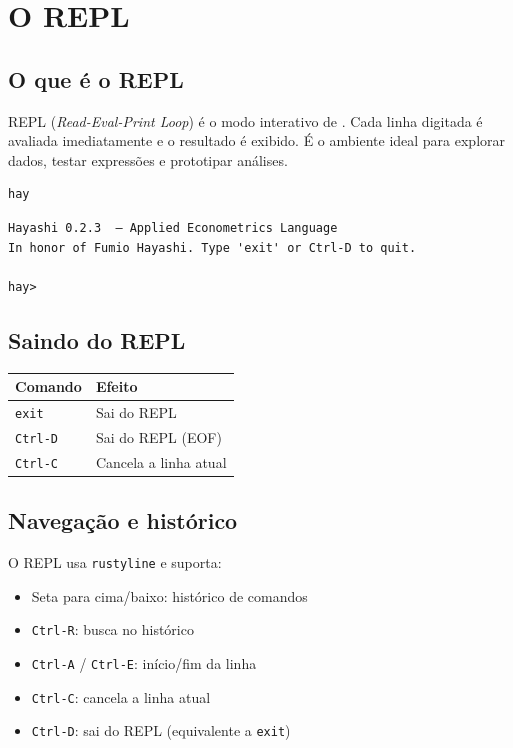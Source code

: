 \chapter{O REPL}

\section{O que é o REPL}

REPL (\textit{Read-Eval-Print Loop}) é o modo interativo de \hayashi{}. Cada linha
digitada é avaliada imediatamente e o resultado é exibido. É o ambiente ideal para
explorar dados, testar expressões e prototipar análises.

\begin{lstlisting}[style=inline, language=sh]
hay
\end{lstlisting}

\begin{lstlisting}[style=inline]
Hayashi 0.2.3  — Applied Econometrics Language
In honor of Fumio Hayashi. Type 'exit' or Ctrl-D to quit.

hay>
\end{lstlisting}

\section{Saindo do REPL}

\begin{center}
\begin{tabular}{ll}
\toprule
\textbf{Comando} & \textbf{Efeito} \\
\midrule
\texttt{exit}   & Sai do REPL \\
\texttt{Ctrl-D} & Sai do REPL (EOF) \\
\texttt{Ctrl-C}                & Cancela a linha atual \\
\bottomrule
\end{tabular}
\end{center}

\section{Navegação e histórico}

O REPL usa \texttt{rustyline} e suporta:

\begin{itemize}
  \item Seta para cima/baixo: histórico de comandos
  \item \texttt{Ctrl-R}: busca no histórico
  \item \texttt{Ctrl-A} / \texttt{Ctrl-E}: início/fim da linha
  \item \texttt{Ctrl-C}: cancela a linha atual
  \item \texttt{Ctrl-D}: sai do REPL (equivalente a \texttt{exit})
\end{itemize}

